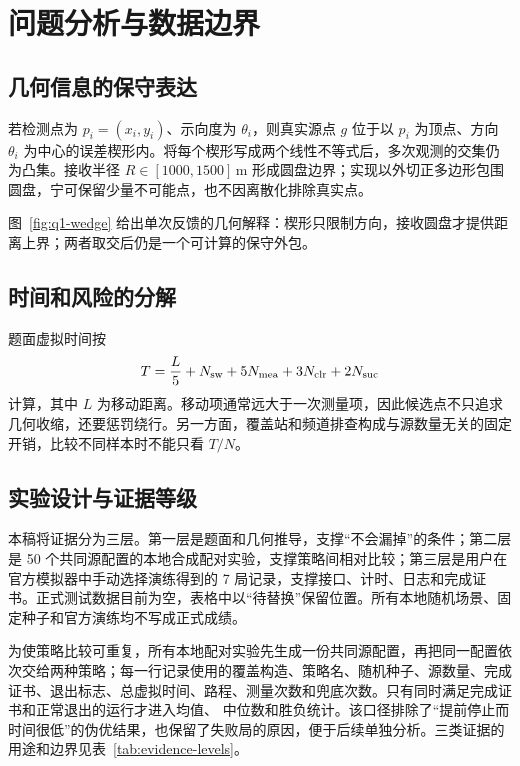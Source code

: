 \section{问题分析与数据边界}
\subsection{几何信息的保守表达}
若检测点为 $p_i=(x_i,y_i)$、示向度为 $\theta_i$，则真实源点 $g$ 位于以 $p_i$ 为顶点、方向 $\theta_i$ 为中心的误差楔形内。将每个楔形写成两个线性不等式后，多次观测的交集仍为凸集。接收半径 $R\in[1000,1500]\,\mathrm m$ 形成圆盘边界；实现以外切正多边形包围圆盘，宁可保留少量不可能点，也不因离散化排除真实点。

图~\ref{fig:q1-wedge} 给出单次反馈的几何解释：楔形只限制方向，接收圆盘才提供距离上界；两者取交后仍是一个可计算的保守外包。

\subsection{时间和风险的分解}
题面虚拟时间按
\begin{equation}\label{eq:time}
T=\frac{L}{5}+N_{\rm sw}+5N_{\rm mea}+3N_{\rm clr}+2N_{\rm suc}
\end{equation}
计算，其中 $L$ 为移动距离。移动项通常远大于一次测量项，因此候选点不只追求几何收缩，还要惩罚绕行。另一方面，覆盖站和频道排查构成与源数量无关的固定开销，比较不同样本时不能只看 $T/N$。

\subsection{实验设计与证据等级}
本稿将证据分为三层。第一层是题面和几何推导，支撑“不会漏掉”的条件；第二层是 50 个共同源配置的本地合成配对实验，支撑策略间相对比较；第三层是用户在官方模拟器中手动选择演练得到的 7 局记录，支撑接口、计时、日志和完成证书。正式测试数据目前为空，表格中以“待替换”保留位置。所有本地随机场景、固定种子和官方演练均不写成正式成绩。

为使策略比较可重复，所有本地配对实验先生成一份共同源配置，再把同一配置依次交给两种策略；每一行记录使用的覆盖构造、策略名、随机种子、源数量、完成证书、退出标志、总虚拟时间、路程、测量次数和兜底次数。只有同时满足完成证书和正常退出的运行才进入均值、 中位数和胜负统计。该口径排除了“提前停止而时间很低”的伪优结果，也保留了失败局的原因，便于后续单独分析。三类证据的用途和边界见表~\ref{tab:evidence-levels}。

